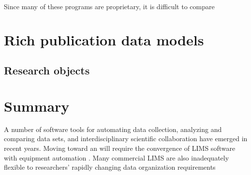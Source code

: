 \documentclass[../thesis]{subfiles}
\begin{document}
Since many of these programs are proprietary, it is difficult to
compare



\section{Rich publication data models}

\subsection{Research objects}







\section{Summary}

A number of software tools for automating data collection, analyzing
and comparing data sets, and interdisciplinary scientific
collaboration have emerged in recent years. Moving toward an    will
require the convergence of LIMS software with equipment automation .
Many commercial LIMS are also inadequately flexible to researchers'
rapidly changing data organization requirements
\end{document}
